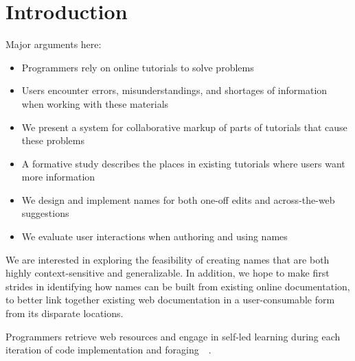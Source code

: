 \section{Introduction}

Major arguments here:
\begin{itemize}
\item Programmers rely on online tutorials to solve problems
\item Users encounter errors, misunderstandings, and shortages of information when working with these materials
\item We present a system for collaborative markup of parts of tutorials that cause these problems
\item A formative study describes the places in existing tutorials where users want more information
\item We design and implement \Glspl{name} for both one-off edits and across-the-web suggestions
\item We evaluate user interactions when authoring and using \Glspl{name}
\end{itemize}

We are interested in exploring the feasibility of creating \glspl{name} that are both highly context-sensitive and generalizable.
In addition, we hope to make first strides in identifying how \glspl{name} can be built from existing online documentation, to better link together existing web documentation in a user-consumable form from its disparate locations.

Programmers retrieve web resources and engage in self-led learning during each iteration of code implementation and foraging~\cite{brandt_two_2009}~\cite{brandt_example-centric_2010}.

